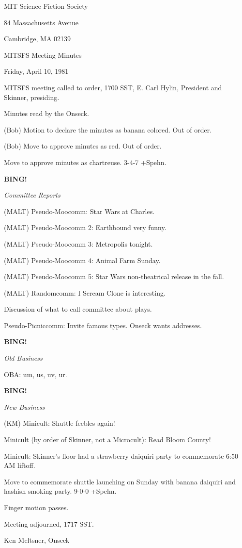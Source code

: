 \documentclass[12pt]{article}
\newcommand{\bing}{{\bf BING!} }
\newcommand{\goto}[1]{\bing \vskip 12pt \centerline{{\em{#1}}}}
\begin{document}
\begin{center}

MIT Science Fiction Society 

84 Massachusetts Avenue

Cambridge, MA 02139

\vspace{12pt}

MITSFS Meeting Minutes 

Friday, April 10, 1981

\end{center}
 
\vspace{18pt}

\setlength{\parskip}{6pt}

\noindent
MITSFS meeting called to order, 1700 SST,
E. Carl Hylin, President and Skinner, presiding.

Minutes read by the Onseck.

(Bob) Motion to declare the minutes as banana colored. Out of order.

(Bob) Move to approve minutes as red. Out of order.

Move to approve minutes as chartreuse. 3-4-7 +Spehn.

\goto{Committee Reports}

(MALT) Pseudo-Moocomm: Star Wars at Charles.

(MALT) Pseudo-Moocomm 2: Earthbound very funny.

(MALT) Pseudo-Moocomm 3: Metropolis tonight.

(MALT) Pseudo-Moocomm 4: Animal Farm Sunday.

(MALT) Pseudo-Moocomm 5: Star Wars non-theatrical release in the fall.

(MALT) Randomcomm: I Scream Clone is interesting.

Discussion of what to call committee about plays.

Pseudo-Picniccomm: Invite famous types. Onseck wants addresses.

\goto{Old Business}

OBA: um, us, uv, ur.

\goto{New Business}

(KM) Minicult: Shuttle feebles again!

Minicult (by order of Skinner, not a Microcult): Read Bloom County!

Minicult: Skinner's floor had a strawberry daiquiri party to commemorate 6:50 AM liftoff.

Move to commemorate shuttle launching on Sunday with banana daiquiri and hashish smoking party. 9-0-0 +Spehn.

Finger motion passes.

\vspace{12pt}

\noindent
Meeting adjourned, 1717 SST.

\vspace{18pt}

\centerline{Ken Meltsner, Onseck}
\end{document}
